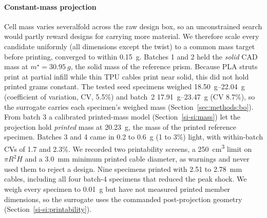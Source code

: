 \documentclass[lineno,nocopyright,upint,varvw,hyphenate]{asmejour}
\newcommand{\siref}[1]{\ref*{si-#1}}
\begin{document}
\paragraph{Constant-mass projection} Cell mass varies severalfold across
the raw design box, so an unconstrained search would partly reward
designs for carrying more material. We therefore scale every candidate
uniformly (all dimensions except the twist) to a common mass target
before printing, converged to within \SI{0.15}{g}. Batches 1 and 2 held
the \emph{solid} CAD mass at $m^{\star} = \SI{30.95}{g}$, the solid mass
of the reference prism. Because PLA struts print at partial infill while
thin TPU cables print near solid, this did not hold printed grams
constant. The tested seed specimens weighed \SIrange{18.50}{22.04}{g}
(coefficient of variation, CV, 5.5\%) and batch~2
\SIrange{17.91}{23.47}{g} (CV 8.7\%), so the surrogate carries each
specimen's weighed mass (Section~\ref{sec:methods:bo}). From batch 3 a
calibrated printed-mass model (Section~\siref{si:mass}) let the
projection hold \emph{printed} mass at \SI{20.23}{g}, the mass of the
printed reference specimen. Batches 3 and 4 came in 0.2 to \SI{0.6}{g}
(1 to 3\%) light, with within-batch CVs of 1.7 and 2.3\%. We recorded
two printability screens, a \SI{250}{cm^3} limit on $\pi R^2 H$ and a
\SI{3.0}{mm} minimum printed cable diameter, as warnings and never used
them to reject a design. Nine specimens printed with 2.51 to
\SI{2.78}{mm} cables, including all four batch-4 specimens that reduced
the peak shock. We weigh every specimen to \SI{0.01}{g} but have not
measured printed member dimensions, so the surrogate uses the commanded
post-projection geometry (Section~\siref{si:printability}).
\end{document}
